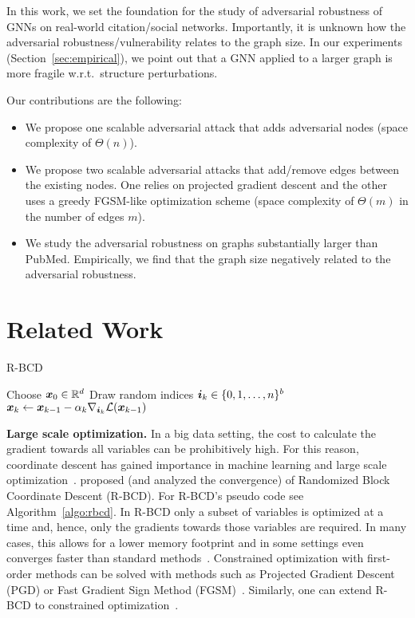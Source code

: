 \documentclass[letterpaper]{article} %
\begin{document}
In this work, we set the foundation for the study of adversarial robustness of GNNs on real-world citation/social networks. Importantly, it is unknown how the adversarial robustness/vulnerability relates to the graph size. In our experiments (Section~\ref{sec:empirical}), we point out that a GNN applied to a larger graph is more fragile w.r.t.\ structure perturbations.

Our contributions are the following:
\begin{itemize}
   \item We propose one scalable adversarial attack that adds adversarial nodes (space complexity of \(\Theta(n)\)).
   \item We propose two scalable adversarial attacks that add/remove edges between the existing nodes. One relies on projected gradient descent and the other uses a greedy FGSM-like optimization scheme (space complexity of \(\Theta(m)\) in the number of edges \(m\)).
   \item We study the adversarial robustness on graphs substantially larger than PubMed. Empirically, we find that the graph size negatively related to the adversarial robustness.
\end{itemize}

\section{Related Work}\label{sec:related} %

\begin{algorithm}[b]
    \small
	\caption{R-BCD~\citep{Nesterov2012}}
	\label{algo:rbcd}
	\begin{algorithmic}[1]
		\STATE Choose \({\bm{x}}_0 \in \mathbb{R}^d\)
		\STATE Draw random indices \({\bm{i}}_k \in \{0, 1, \dots, n\}^b\)
		\STATE \({\bm{x}}_{k} \leftarrow {\bm{x}}_{k-1} - \alpha_{k} \nabla_{{\bm{i}}_{k}} \mathcal{L}({\bm{x}}_{k-1})\)
		\ENDFOR
	\end{algorithmic}
\end{algorithm}

\textbf{Large scale optimization.} In a big data setting, the cost to calculate the gradient towards all variables can be prohibitively high. For this reason, coordinate descent has gained importance in machine learning and large scale optimization~\citep{Wright2015}. \citet{Nesterov2012} proposed (and analyzed the convergence) of Randomized Block Coordinate Descent (R-BCD). For R-BCD's pseudo code see Algorithm~\ref{algo:rbcd}. In R-BCD only a subset of variables is optimized at a time and, hence, only the gradients towards those variables are required. In many cases, this allows for a lower memory footprint and in some settings even converges faster than standard methods~\citep{Nesterov2017}. Constrained optimization with first-order methods can be solved with methods such as Projected Gradient Descent (PGD) or Fast Gradient Sign Method (FGSM)~\cite{Goodfellow2015}. Similarly, one can extend R-BCD to constrained optimization~\citep{Nesterov2012}.
\end{document}
